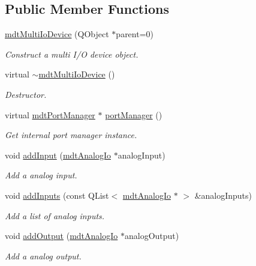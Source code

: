 \subsection*{Public Member Functions}
\begin{DoxyCompactItemize}
\item 
\hyperlink{classmdt_multi_io_device_ab6e4ede8f29e182e63f6b190c8ac4cae}{mdt\-Multi\-Io\-Device} (Q\-Object $\ast$parent=0)
\begin{DoxyCompactList}\small\item\em Construct a multi I/\-O device object. \end{DoxyCompactList}\item 
virtual \hyperlink{classmdt_multi_io_device_ae130f371614b06b44fa391732c63c71e}{$\sim$mdt\-Multi\-Io\-Device} ()
\begin{DoxyCompactList}\small\item\em Destructor. \end{DoxyCompactList}\item 
virtual \hyperlink{classmdt_port_manager}{mdt\-Port\-Manager} $\ast$ \hyperlink{classmdt_multi_io_device_a71765ab3a9f8aa9ba4024e3cba10c80e}{port\-Manager} ()
\begin{DoxyCompactList}\small\item\em Get internal port manager instance. \end{DoxyCompactList}\item 
void \hyperlink{classmdt_multi_io_device_a7eac1455f50951f25a860ef22eb53cd6}{add\-Input} (\hyperlink{classmdt_analog_io}{mdt\-Analog\-Io} $\ast$analog\-Input)
\begin{DoxyCompactList}\small\item\em Add a analog input. \end{DoxyCompactList}\item 
void \hyperlink{classmdt_multi_io_device_a6c56cd0f8379e6090520a8ae07e1dec5}{add\-Inputs} (const Q\-List$<$ \hyperlink{classmdt_analog_io}{mdt\-Analog\-Io} $\ast$ $>$ \&analog\-Inputs)
\begin{DoxyCompactList}\small\item\em Add a list of analog inputs. \end{DoxyCompactList}\item 
void \hyperlink{classmdt_multi_io_device_afef971431b2db32e31994d18aa3a6522}{add\-Output} (\hyperlink{classmdt_analog_io}{mdt\-Analog\-Io} $\ast$analog\-Output)
\begin{DoxyCompactList}\small\item\em Add a analog output. \end{DoxyCompactList}\item 

\end{DoxyCompactItemize}
